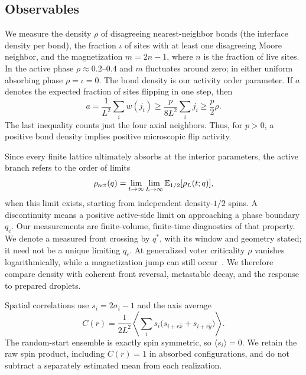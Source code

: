 \subsection{Observables}

We measure the density $\rho$ of disagreeing nearest-neighbor bonds (the interface density per
bond), the fraction $\iota$ of sites with at least one disagreeing Moore neighbor, and the
magnetization $m = 2n-1$, where $n$ is the fraction of live sites. In the active phase
$\rho\approx 0.2$--$0.4$ and $m$ fluctuates around zero; in either uniform
absorbing phase $\rho = \iota = 0$.
The bond density is our activity order parameter. If $a$ denotes the expected
fraction of sites flipping in one step, then
\begin{equation}
 a=\frac{1}{L^2}\sum_i w(j_i)\ge\frac{p}{8L^2}\sum_i j_i\ge\frac{p}{2}\rho .
 \label{eq:activitybound}
\end{equation}
The last inequality counts just the four axial neighbors. Thus, for $p>0$,
a positive bond density implies positive microscopic flip activity.

Since every finite lattice ultimately absorbs at the interior parameters,
the active branch refers to the order of limits
\begin{equation}
 \rho_{\rm act}(q)=\lim_{t\to\infty}\lim_{L\to\infty}
     \mathbb E_{1/2}[\rho_L(t;q)],
 \label{eq:limits}
\end{equation}
when this limit exists, starting from independent density-$1/2$ spins.
A discontinuity means a positive active-side limit on approaching a phase
boundary $q_c$. Our measurements are finite-volume, finite-time diagnostics
of that property. We denote a measured front crossing by $q^*$, with its
window and geometry stated; it need not be a unique limiting $q_c$.
At generalized voter criticality $\rho$ vanishes logarithmically, while a
magnetization jump can still occur~\cite{dornic2001,alhammal2005}.
We therefore compare density with coherent front reversal, metastable decay,
and the response to prepared droplets.

Spatial correlations use $s_i=2\sigma_i-1$ and the axis average
\begin{equation}
C(r)=\frac{1}{2L^2}\left\langle\sum_i s_i
\bigl(s_{i+r\hat x}+s_{i+r\hat y}\bigr)\right\rangle.
\label{eq:correlation}
\end{equation}
The random-start ensemble is exactly spin symmetric, so $\langle s_i\rangle=0$.
We retain the raw spin product, including $C(r)=1$ in absorbed configurations,
and do not subtract a separately estimated mean from each realization.


